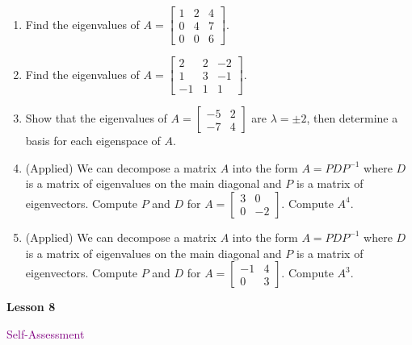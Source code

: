 \documentclass[10pt]{book}
\theoremstyle{definition}
\theoremstyle{remark}
\begin{document}
\begin{large}
\begin{enumerate}
\item Find the eigenvalues of $A = \begin{bmatrix}1&2&4\\0&4&7\\0&0&6 \end{bmatrix}$.\vfil\vfil
\item Find the eigenvalues of $A = \begin{bmatrix}2&2&-2\\1&3&-1\\-1&1&1 \end{bmatrix}$.\vfil
\newpage

\item Show that the eigenvalues of $A = \begin{bmatrix}-5 & 2  \\ -7 & 4 \end{bmatrix}$ are $\lambda = \pm 2$, then determine a basis for each eigenspace of $A$. 
\newpage

\item (Applied) We can decompose a matrix $A$ into the form $A = PDP^{-1}$ where $D$ is a  matrix of eigenvalues on the main diagonal and $P$ is a matrix of eigenvectors. Compute $P$ and $D$ for $A = \begin{bmatrix}3 & 0 \\ 0 & -2\end{bmatrix}$. Compute $A^4$.\vfil \vfil
\item (Applied) We can decompose a matrix $A$ into the form $A = PDP^{-1}$ where $D$ is a  matrix of eigenvalues on the main diagonal and $P$ is a matrix of eigenvectors. Compute $P$ and $D$ for $A = \begin{bmatrix}-1 &4 \\ 0 & 3\end{bmatrix}$. Compute $A^3$.\vfil
\end{enumerate}
\end{large}
\newpage


\begin{tcolorbox}[
  width=\textwidth,
  colback=gray!10, %
  colframe=white, %
  boxrule=0pt,    %
  left=1cm,       %
  right=1cm,      %
  sharp corners  %
]

\begin{minipage}[t]{0.5\textwidth}
  \Huge \textbf{Lesson 8}
\end{minipage}%
\hfill
\begin{minipage}[t]{0.5\textwidth}
  \Huge\textcolor{purple}{Self-Assessment}
\end{minipage}
\end{tcolorbox}
\end{document}
